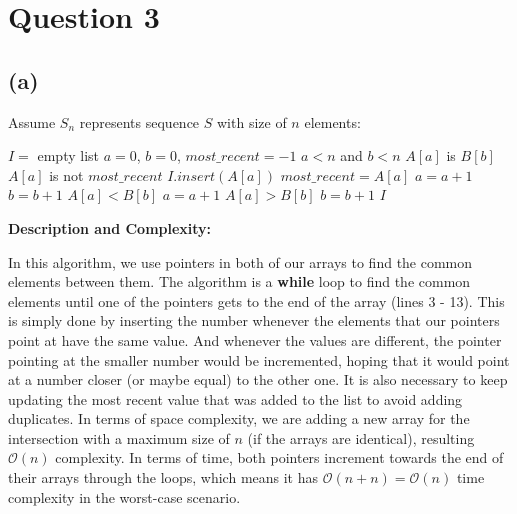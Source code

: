 
\section{Question 3}
    \subsection{(a)}
    \begin{spacing}{1.2}
        Assume $S_n$ represents sequence $S$ with size of $n$ elements:
        \begin{codebox}
            \li $I =$ empty list
            \li $a = 0$, $b = 0$, $most\_recent = -1$
            \li \While $a < n$ and $b<n$
                \Do
                    \li \If $A[a]$ is $B[b]$
                    \Then
                        \li \If $A[a]$ is not $most\_recent$
                        \Then
                            \li $I.insert(A[a])$
                            \li $most\_recent = A[a]$
                        \End
                        \li $a = a + 1$
                        \li $b = b + 1$
                    \li \ElseIf $A[a] < B[b]$
                    \Then
                        \li $a = a + 1$
                    \li \ElseIf $A[a] > B[b]$
                    \Then
                        \li $b = b + 1$
                    \End 
                \End
            \li \Return $I$
        \end{codebox}
    \end{spacing}
    \vspace{5mm}
    \textbf{Description and Complexity:}
    
    In this algorithm, we use pointers in both of our arrays to find the common elements between them.
    The algorithm is a \textbf{while} loop to find the common elements until one of the pointers gets to the end of the array (lines 3 - 13).
    This is simply done by inserting the number whenever the elements that our pointers point at have the same value.
    And whenever the values are different, the pointer pointing at the smaller number would be incremented, hoping that it 
    would point at a number closer (or maybe equal) to the other one. It is also necessary to keep updating the most recent value
    that was added to the list to avoid adding duplicates. In terms of space complexity, we are adding a new array 
    for the intersection with a maximum size of $n$ (if the arrays are identical), resulting $\mathcal{O}(n)$ complexity. In terms of time, both pointers
    increment towards the end of their arrays through the loops, which means it has $\mathcal{O}(n+n)=\mathcal{O}(n)$ time complexity in the worst-case scenario. \\
    
